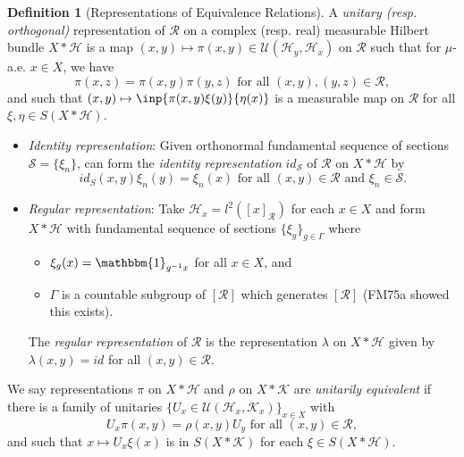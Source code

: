 \documentclass[12pt]{article}
\renewcommand{\H}{\mathcal{H}}
\newcommand{\K}{\mathcal{K}}
\newcommand{\ind}{\mathbbm{1}}
\theoremstyle{definition}
\newtheorem{definition}{Definition}[]
\theoremstyle{plain}
\theoremstyle{remark}
\begin{document}
\begin{definition}[Representations of Equivalence Relations]
    A \textit{unitary (resp. orthogonal)} representation of $ \mathcal{R} $ on a complex (resp. real) measurable Hilbert bundle $ X\ast \H $ is a map $ (x,y)\mapsto \pi(x,y)\in \mathcal{U}(\H_{y},\H_{x}) $ on $ \mathcal{R} $ such that for $ \mu $-a.e. $ x\in X $, we have 
    \[
        \pi(x,z) = \pi(x,y) \pi(y,z) \text{ for all } (x,y),(y,z)\in \mathcal{R},
    \]
    and such that $ (x,y)\mapsto \inp{\pi(x,y) \xi(y)}{\eta(x)} $ is a measurable map on $ \mathcal{R} $ for all $ \xi,\eta\in S(X\ast\H) $.

    \begin{itemize}
        \item \textit{Identity representation}: Given orthonormal fundamental sequence of sections $ \mathcal{S} = \{\xi_{n}\}$, can form the \textit{identity representation} $ id_{\mathcal{S}} $ of $ \mathcal{R} $ on $ X\ast\H $ by 
            \[
                id_{S}(x,y) \xi_{n}(y) = \xi_{n}(x) \text{ for all } (x,y)\in \mathcal{R} \text{ and } \xi_{n} \in \mathcal{S}.
            \]
        \item \textit{Regular representation}: Take $ \H_{x} = l^{2}([x]_{\mathcal{R}}) $ for each $ x\in X $ and form $ X\ast \H $ with fundamental sequence of sections $ \{\xi_{g}\}_{g\in \Gamma} $ where 
            \begin{itemize}
                \item $ \xi_{g}(x) = \ind_{g^{-1}x} $ for all $ x\in X $, and
                \item $ \Gamma $ is a countable subgroup of $ [\mathcal{R}] $ which generates $ [\mathcal{R}] $ (FM75a showed this exists).
            \end{itemize}
        The \textit{regular representation} of $ \mathcal{R} $ is the representation $ \lambda $ on $ X\ast\H $ given by $ \lambda(x,y) = id $ for all $ (x,y)\in \mathcal{R} $.
    \end{itemize}
    

    We say representations $ \pi $ on $ X\ast \H $ and $ \rho $ on $ X\ast\K $ are \textit{unitarily equivalent} if there is a family of unitaries $ \{U_{x} \in \mathcal{U}(\H_{x},\K_{x})\}_{x\in X} $ with
    \[
        U_{x} \pi(x,y) = \rho(x,y) U_{y} \text{ for all } (x,y)\in \mathcal{R},
    \]
    and such that $ x\mapsto U_{x} \xi(x) $ is in $ S(X\ast\K) $ for each $ \xi\in S(X\ast\H) $.

\end{definition}
\end{document}
